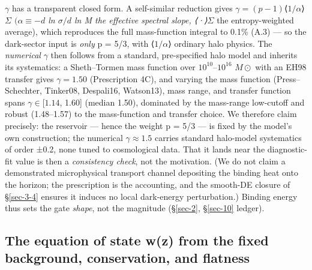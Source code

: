\documentclass[preprint,12pt]{elsarticle}
\begin{document}
\(\gamma\) has a transparent closed form. A self-similar reduction gives
\(\gamma  = (p - 1)\)⟨\(1/\alpha\)⟩\emph{\(\Sigma\)
\((\alpha  \equiv  -d\) ln \(\sigma /d\) ln M the effective spectral
slope, ⟨·⟩}\(\Sigma\) the entropy-weighted average), which reproduces
the full mass-function integral to 0.1\% (A.3) --- so the dark-sector
input is \emph{only} p = 5/3, with ⟨\(1/\alpha\)⟩ ordinary halo physics.
The \emph{numerical} \(\gamma\) then follows from a standard,
pre-specified halo model and inherits its systematics: a Sheth--Tormen
mass function over \(10^{10}\)--\(10^{16}\) \(M\odot\) with an EH98
transfer gives \(\gamma  = 1.50\) (Prescription 4C), and varying the
mass function (Press--Schechter, Tinker08, Despali16, Watson13), mass
range, and transfer function spans \(\gamma  \in  [1.14\), 1.60{]}
(median 1.50), dominated by the mass-range low-cutoff and robust
(1.48--1.57) to the mass-function and transfer choice. We therefore
claim precisely: the reservoir --- hence the weight p = 5/3 --- is fixed
by the model's own construction; the numerical \(\gamma  \approx  1.5\)
carries standard halo-model systematics of order ±0.2, none tuned to
cosmological data. That it lands near the diagnostic-fit value is then a
\emph{consistency check}, not the motivation. (We do not claim a
demonstrated microphysical transport channel depositing the binding heat
onto the horizon; the prescription is the accounting, and the smooth-DE
closure of §\ref{sec-3-4} ensures it induces no local dark-energy
perturbation.) Binding energy thus sets the gate \emph{shape}, not the
magnitude (§\ref{sec-2}, §\ref{sec-10} ledger).

\subsection{The equation of state w(z) from the fixed background,
conservation, and flatness}\label{sec-3-2}
\end{document}
